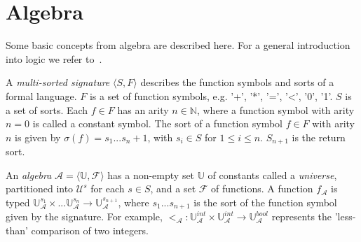 \section{Algebra}\label{sec:algebra}

Some basic concepts from algebra are described here. For a general introduction into logic we refer to~\cite{Huth:logic}.

A \textit{multi-sorted signature} $\langle S, F\rangle$ describes the function symbols and sorts of a formal language. $F$ is a set of function symbols, e.g. '+', '*', '=', '<', '0', '1'. $S$ is a set of sorts. Each $f\in F$ has an arity $n \in \mathbb{N}$, where a function symbol with arity $n = 0$ is called a constant symbol. The sort of a function symbol $f \in F$ with arity $n$ is given by $\sigma(f) = s_1 ... s_n+1$, with $s_i \in S$ for $1 \leq i \leq n$. $S_{n+1}$ is the return sort.

An \textit{algebra} $\mathcal{A} = \langle \mathbb{U}, \mathcal{F}\rangle$ has a non-empty set $\mathbb{U}$ of constants called a \textit{universe}, partitioned into $\mathcal{U}^s$ for each $s\in S$, and a set $\mathcal{F}$ of functions. A function $f_\mathcal{A}$ is typed $\mathbb{U}_\mathcal{A}^{s_1} \times ... \mathbb{U}_\mathcal{A}^{s_n} \rightarrow \mathbb{U}_\mathcal{A}^{s_{n+1}}$, where $s_1 ... s_{n+1}$ is the sort of the function symbol given by the signature. For example, $<_\mathcal{A}: \mathbb{U}_\mathcal{A}^{int} \times \mathbb{U}_\mathcal{A}^{int} \rightarrow \mathbb{U}_\mathcal{A}^{bool}$ represents the 'less-than' comparison of two integers.
 
